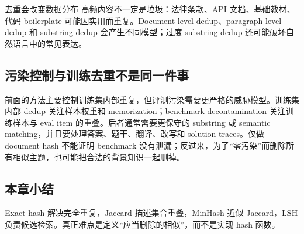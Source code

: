 \begin{warningbox}{去重会改变数据分布}
高频内容不一定是垃圾：法律条款、API 文档、基础教材、代码 boilerplate 可能因实用而重复。Document-level dedup、paragraph-level dedup 和 substring dedup 会产生不同模型；过度 substring dedup 还可能破坏自然语言中的常见表达。
\end{warningbox}


\subsection{污染控制与训练去重不是同一件事}

前面的方法主要控制训练集内部重复，但评测污染需要更严格的威胁模型。训练集内部 dedup 关注样本权重和 memorization；benchmark decontamination 关注训练样本与 eval item 的重叠。后者通常需要更保守的 substring 或 semantic matching，并且要处理答案、题干、翻译、改写和 solution traces。仅做 document hash 不能证明 benchmark 没有泄漏；反过来，为了“零污染”而删除所有相似主题，也可能把合法的背景知识一起删掉。

\subsection{本章小结}

Exact hash 解决完全重复，Jaccard 描述集合重叠，MinHash 近似 Jaccard，LSH 负责候选检索。真正难点是定义“应当删除的相似”，而不是实现 hash 函数。

